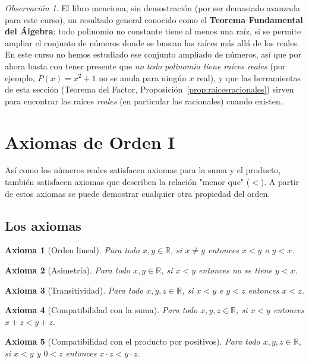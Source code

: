 \documentclass[11pt]{article}
\newtheorem{axioma}{Axioma}[section]
\theoremstyle{remark}
\newtheorem*{observacion}{Observación}
\begin{document}
\begin{observacion}
El libro menciona, sin demostración (por ser demasiado avanzada para este
curso), un resultado general conocido como el \textbf{Teorema Fundamental
del Álgebra}: todo polinomio no constante tiene al menos una raíz, si se
permite ampliar el conjunto de números donde se buscan las raíces más allá
de los reales. En este curso no hemos estudiado ese conjunto ampliado de
números, así que por ahora basta con tener presente que \emph{no todo
polinomio tiene raíces reales} (por ejemplo, $P(x) = x^2+1$ no se anula para
ningún $x$ real), y que las herramientas de esta sección (Teorema del
Factor, Proposición~\ref{prop:raicesracionales}) sirven para encontrar las
raíces \emph{reales} (en particular las racionales) cuando existen.
\end{observacion}

\section{Axiomas de Orden I}

Así como los números reales satisfacen axiomas para la suma y el producto,
también satisfacen axiomas que describen la relación "menor que" ($<$). A
partir de estos axiomas se puede demostrar cualquier otra propiedad del
orden.

\subsection{Los axiomas}

\begin{axioma}[Orden lineal]
Para todo $x,y \in \mathbb{R}$, si $x \neq y$ entonces $x<y$ o $y<x$.
\end{axioma}

\begin{axioma}[Asimetría]
Para todo $x,y \in \mathbb{R}$, si $x<y$ entonces no se tiene $y<x$.
\end{axioma}

\begin{axioma}[Transitividad]
Para todo $x,y,z \in \mathbb{R}$, si $x<y$ e $y<z$ entonces $x<z$.
\end{axioma}

\begin{axioma}[Compatibilidad con la suma]
Para todo $x,y,z \in \mathbb{R}$, si $x<y$ entonces $x+z<y+z$.
\end{axioma}

\begin{axioma}[Compatibilidad con el producto por positivos]
Para todo $x,y,z \in \mathbb{R}$, si $x<y$ y $0<z$ entonces $x\cdot z < y \cdot z$.
\end{axioma}
\end{document}
